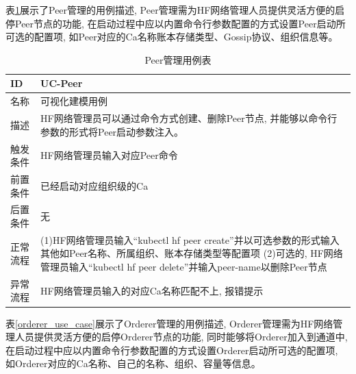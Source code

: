 表\ref{peer_use_case}展示了Peer管理的用例描述, Peer管理需为HF网络管理人员提供灵活方便的启停Peer节点的功能, 在启动过程中应以内置命令行参数配置的方式设置Peer启动所可选的配置项, 如Peer对应的Ca名称账本存储类型、Gossip协议、组织信息等。

\newpage

{\footnotesize
\begin{longtable}[h]{m{60pt}|m{280pt}}
    \caption[Peer管理用例表]{Peer管理用例表} \label{peer_use_case} \\
        \hline  
        ID&UC-Peer\\
        \hline
        名称&可视化建模用例\\
        \hline
        描述&HF网络管理员可以通过命令方式创建、删除Peer节点, 并能够以命令行参数的形式将Peer启动参数注入。\\
        \hline
        触发条件&HF网络管理员输入对应Peer命令\\
        \hline
        前置条件&已经启动对应组织级的Ca\\
        \hline
        后置条件&无\\
        \hline
        正常流程& (1)HF网络管理员输入“kubectl hf peer create”并以可选参数的形式输入其他如Peer名称、所属组织、账本存储类型等配置项
        \newline (2)可选的, HF网络管理员输入“kubectl hf peer delete”并输入peer-name以删除Peer节点 \\
        \hline
        异常流程& HF网络管理员输入的对应Ca名称匹配不上, 报错提示\\
        \hline
    \end{longtable} 
}

表\ref{orderer_use_case}展示了Orderer管理的用例描述, Orderer管理需为HF网络管理人员提供灵活方便的启停Orderer节点的功能, 同时能够将Orderer加入到通道中,在启动过程中应以内置命令行参数配置的方式设置Orderer启动所可选的配置项, 如Orderer对应的Ca名称、自己的名称、组织、容量等信息。



